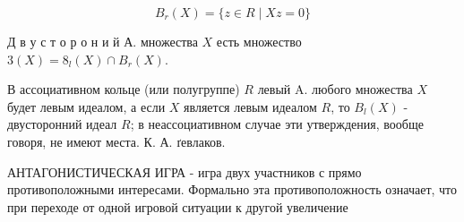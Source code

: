 \documentclass[10pt]{article}
\begin{document}
\[

B_{r}(X)=\{z \in R \mid X z=0\}

\]



Д в у с т о р о н и й А. множества $X$ есть множество $3(X)=8_{l}(X) \cap B_{r}(X)$.



В ассоциативном кольце (или полугруппе) $R$ левый $\mathrm{A}$. любого множества $X$ будет левым идеалом, а если $X$ является левым идеалом $R$, то $B_{l}(X)$ - двусторонний идеал $R$; в неассоциативном случае эти утверждения, вообще говоря, не имеют места. К. А. ґевлаков.



АНТАГОНИСТИЧЕСКАЯ ИГРА - игра двух участников с прямо противоположными интересами. Формально эта противоположность означает, что при переходе от одной игровой ситуации к другой увеличение
\end{document}
